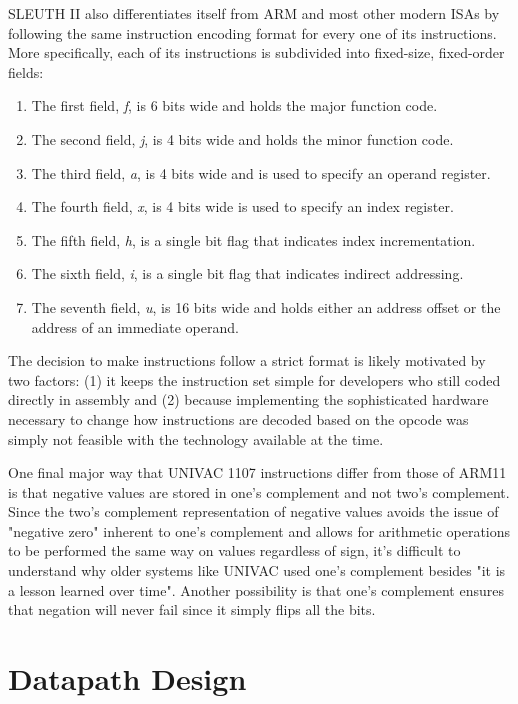 \documentclass[onecolumn, draftclsnofoot, 10pt, compsoc]{IEEEtran}
\begin{document}
SLEUTH II also differentiates itself from ARM and most other modern ISAs by following the same instruction encoding format for every one of its instructions. More specifically, each of its instructions is subdivided into fixed-size, fixed-order fields:
\begin{enumerate}
\item The first field, \textit{f}, is 6 bits wide and holds the major function code.
\item The second field, \textit{j}, is 4 bits wide and holds the minor function code.
\item The third field, \textit{a}, is 4 bits wide and is used to specify an operand register.
\item The fourth field, \textit{x}, is 4 bits wide is used to specify an index register.
\item The fifth field, \textit{h}, is a single bit flag that indicates index incrementation.
\item The sixth field, \textit{i}, is a single bit flag that indicates indirect addressing.
\item The seventh field, \textit{u}, is 16 bits wide and holds either an address offset or the address of an immediate operand.
\end{enumerate}
The decision to make instructions follow a strict format is likely motivated by two factors: (1) it keeps the instruction set simple for developers who still coded directly in assembly and (2) because implementing the sophisticated hardware necessary to change how instructions are decoded based on the opcode was simply not feasible with the technology available at the time.

One final major way that UNIVAC 1107 instructions differ from those of ARM11 is that negative values are stored in one's complement and not two's complement. Since the two's complement representation of negative values avoids the issue of "negative zero" inherent to one's complement and allows for arithmetic operations to be performed the same way on values regardless of sign, it's difficult to understand why older systems like UNIVAC used one's complement besides "it is a lesson learned over time". Another possibility is that one's complement ensures that negation will never fail since it simply flips all the bits.
\section{Datapath Design}
\end{document}

